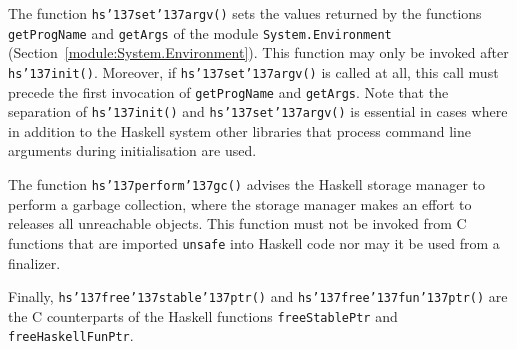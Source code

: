 The function \mbox{\tt hs{\char'137}set{\char'137}argv()} sets the values returned by the functions
\mbox{\tt getProgName} and \mbox{\tt getArgs} of the module \mbox{\tt System.Environment} (Section~\ref{module:System.Environment}).  This function may only be invoked after
\mbox{\tt hs{\char'137}init()}.  Moreover, if \mbox{\tt hs{\char'137}set{\char'137}argv()} is called at all, this
call must precede the first invocation of \mbox{\tt getProgName} and
\mbox{\tt getArgs}.  Note that the separation of \mbox{\tt hs{\char'137}init()} and
\mbox{\tt hs{\char'137}set{\char'137}argv()} is essential in cases where in addition to the Haskell
system other libraries that process command line arguments during
initialisation are used.

The function \mbox{\tt hs{\char'137}perform{\char'137}gc()} advises the Haskell storage manager to
perform a garbage collection, where the storage manager makes an effort to
releases all unreachable objects.  This function must not be invoked from C
functions that are imported \mbox{\tt unsafe} into Haskell code nor may it be used
from a finalizer.

Finally, \mbox{\tt hs{\char'137}free{\char'137}stable{\char'137}ptr()} and \mbox{\tt hs{\char'137}free{\char'137}fun{\char'137}ptr()} are
the C counterparts of the Haskell functions \mbox{\tt freeStablePtr} and
\mbox{\tt freeHaskellFunPtr}.

